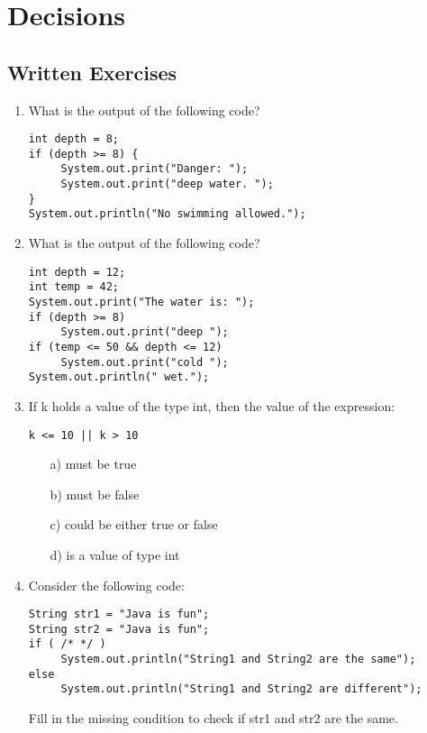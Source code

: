 \section{Decisions}

\subsection{Written Exercises}

\setcounter{counter}{1}
\begin{enumerate}[label={\arabic{counter}\addtocounter{counter}{1}}.]

\item What is the output of the following code?
\begin{lstlisting}
int depth = 8;
if (depth >= 8) {
     System.out.print("Danger: ");
     System.out.print("deep water. ");
}
System.out.println("No swimming allowed.");
\end{lstlisting}

\item What is the output of the following code?
\begin{lstlisting}
int depth = 12;
int temp = 42;
System.out.print("The water is: ");
if (depth >= 8)
     System.out.print("deep ");
if (temp <= 50 && depth <= 12)
     System.out.print("cold ");
System.out.println(" wet.");
\end{lstlisting}

\item If k holds a value of the type int, then the value of the expression:
\begin{lstlisting}
k <= 10 || k > 10
\end{lstlisting}
\begin{enumerate}
\item[a)] must be true
\item[b)] must be false
\item[c)] could be either true or false
\item[d)] is a value of type int
\end{enumerate}

\item Consider the following code:
\begin{lstlisting}
String str1 = "Java is fun";
String str2 = "Java is fun";
if ( /* */ )
     System.out.println("String1 and String2 are the same");
else
     System.out.println("String1 and String2 are different");
\end{lstlisting}
Fill in the missing condition to check if str1 and str2 are the same.


\end{enumerate}
